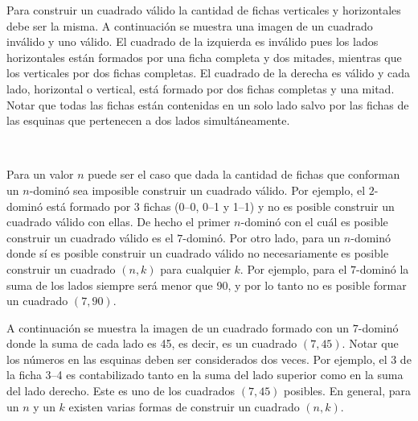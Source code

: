\documentclass{oci}
\begin{document}
Para construir un cuadrado válido la cantidad de fichas verticales y horizontales debe ser la misma.
A continuación se muestra una imagen de un cuadrado inválido y uno válido.
El cuadrado de la izquierda es inválido pues los lados horizontales están formados por una ficha completa y dos mitades, mientras que los verticales por dos fichas completas.
El cuadrado de la derecha es válido y cada lado, horizontal o vertical, está formado por dos fichas completas y una mitad.
Notar que todas las fichas están contenidas en un solo lado salvo por las fichas de las esquinas que pertenecen a dos lados simultáneamente.


 \begin{minipage}[b]{0.5\textwidth}
  \centering
  
\end{minipage}
~
\begin{minipage}[b]{0.5\textwidth}
  \centering
  
\end{minipage}

Para un valor $n$ puede ser el caso que dada la cantidad de fichas que conforman un $n$-dominó sea imposible construir un cuadrado válido.
Por ejemplo, el $2$-dominó está formado por 3 fichas (0--0, 0--1 y 1--1) y no es posible construir un cuadrado válido con ellas.
De hecho el primer $n$-dominó con el cuál es posible construir un cuadrado válido es el $7$-dominó.
Por otro lado, para un $n$-dominó donde sí es posible construir un cuadrado válido no necesariamente es posible construir un cuadrado $(n,k)$ para cualquier $k$.
Por ejemplo, para el $7$-dominó la suma de los lados siempre será menor que 90, y por lo tanto no es posible formar un cuadrado $(7,90)$.

A continuación se muestra la imagen de un cuadrado formado con un $7$-dominó donde la suma de cada lado es 45, es decir, es un cuadrado $(7,45)$.
Notar que los números en las esquinas deben ser considerados dos veces.
Por ejemplo, el 3 de la ficha 3--4 es contabilizado tanto en la suma del lado superior como en la suma del lado derecho.
Este es uno de los cuadrados $(7,45)$ posibles. En general, para un $n$ y un $k$ existen varias formas de construir un cuadrado $(n,k)$.

\begin{minipage}{\textwidth}
 \centering
 
\end{minipage}
\end{document}
